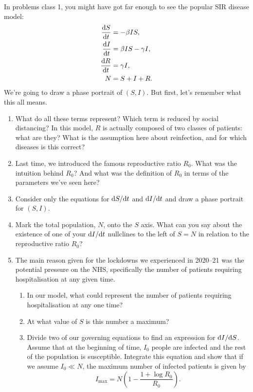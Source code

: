 \documentclass[a4paper,12pt]{article}
\begin{document}
%

\begin{enumerate}[label={\bf \arabic{*}.\;}, ref={\arabic{*}},itemsep=3ex, left=0ex]

    { %
      In problems class 1, you might have got far enough to see the popular SIR disease model:
      \begin{align}
        \fd{S}{t} &= - \beta I S, \\
        \fd{I}{t} &= \beta I S - \gamma I, \\
        \fd{R}{t} &= \gamma I, \\
        N &= S + I + R.
      \end{align}
      We're going to draw a phase portrait of $(S,I)$. But first, let's remember what this all means.
      \begin{enumerate}[label=(\alph*)]
        \item What do all these terms represent? Which term is reduced by social distancing? In this model, $R$ is actually composed of two classes of patients: what are they? What is the assumption here about reinfection, and for which diseases is this correct?
        \item Last time, we introduced the famous reproductive ratio $R_0$. What was the intuition behind $R_0$? And what was the definition of $R_0$ in terms of the parameters we've seen here?
        \item Consider only the equations for $\fd{S}{t}$ and $\fd{I}{t}$ and draw a phase portrait for $(S,I)$.
        \item Mark the total population, $N$, onto the $S$ axis. What can you say about the existence of one of your $\fd{I}{t}$ nullclines to the left of $S=N$ in relation to the reproductive ratio $R_0$?
        \item The main reason given for the lockdowns we experienced in 2020--21 was the potential pressure on the NHS, specifically the number of patients requiring hospitalisation at any given time.
          \begin{enumerate}[label=(\roman*)]
            \item In our model, what could represent the number of patients requiring hospitalisation at any one time?
            \item At what value of $S$ is this number a maximum?
            \item Divide two of our governing equations to find an expression for $\fd{I}{S}$. Assume that at the beginning of time, $I_0$ people are infected and the rest of the population is susceptible. Integrate this equation and show that if we assume $I_0 \ll N$, the maximum number of infected patients is given by
              \begin{equation}
                I_{\text{max}} = N\left(1 - \frac{1+\log R_0}{R_0}\right).
              \end{equation}
          \end{enumerate}


\end{enumerate}}
\end{enumerate}
\end{document}
